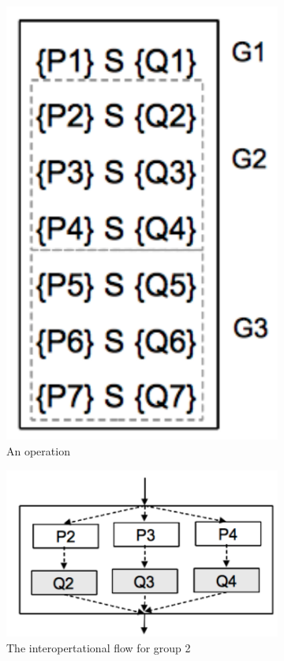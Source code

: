 \begin{figure}
  \begin{subfigure}[b]{0.4\textwidth}
    \centering
    \includegraphics[width=.4\linewidth]{figs/cfg-example1}
    \caption{An operation}
    \label{fig:cfga}
  \end{subfigure}%
  \begin{subfigure}[b]{0.4\textwidth}
    \centering
    \includegraphics[width=.4\linewidth]{figs/cfg-example2}
    \caption{The interopertational flow for group 2}
    \label{fig:cfgb}
  \end{subfigure}%
  \begin{subfigure}[b]{0.2\textwidth}
    \centering

\end{subfigure}
\end{figure}
